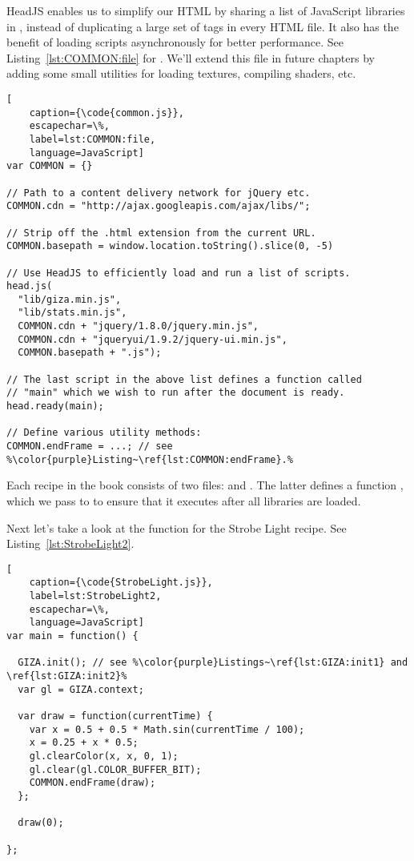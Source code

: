 HeadJS enables us to simplify our HTML by sharing a list of JavaScript libraries in , instead of duplicating a large set of  tags in every HTML file.  It also has the benefit of loading scripts asynchronously for better performance.  See Listing~\ref{lst:COMMON:file} for .  We'll extend this file in future chapters by adding some small utilities for loading textures, compiling shaders, etc.

\begin{lstlisting}[
    caption={\code{common.js}},
    escapechar=\%,
    label=lst:COMMON:file,
    language=JavaScript]
var COMMON = {}

// Path to a content delivery network for jQuery etc.
COMMON.cdn = "http://ajax.googleapis.com/ajax/libs/";

// Strip off the .html extension from the current URL.
COMMON.basepath = window.location.toString().slice(0, -5)

// Use HeadJS to efficiently load and run a list of scripts.
head.js(
  "lib/giza.min.js",
  "lib/stats.min.js",
  COMMON.cdn + "jquery/1.8.0/jquery.min.js",
  COMMON.cdn + "jqueryui/1.9.2/jquery-ui.min.js",
  COMMON.basepath + ".js");

// The last script in the above list defines a function called
// "main" which we wish to run after the document is ready.
head.ready(main);

// Define various utility methods:
COMMON.endFrame = ...; // see %\color{purple}Listing~\ref{lst:COMMON:endFrame}.%
\end{lstlisting} 

Each recipe in the book consists of two files:  and .  The latter defines a function , which we pass to  to ensure that it executes after all libraries are loaded.

\begin{comment}
{RecipeName}.js
{RecipeName}.html
common.js
css/style.css
lib/head.load.min.js
lib/giza.min.js
lib/stats.min.js
\end{comment}

Next let's take a look at the  function for the Strobe Light recipe.  See Listing~\ref{lst:StrobeLight2}.

\begin{lstlisting}[
    caption={\code{StrobeLight.js}},
    label=lst:StrobeLight2,
    escapechar=\%,
    language=JavaScript]
var main = function() {

  GIZA.init(); // see %\color{purple}Listings~\ref{lst:GIZA:init1} and \ref{lst:GIZA:init2}%
  var gl = GIZA.context;

  var draw = function(currentTime) {
    var x = 0.5 + 0.5 * Math.sin(currentTime / 100);
    x = 0.25 + x * 0.5;
    gl.clearColor(x, x, 0, 1);
    gl.clear(gl.COLOR_BUFFER_BIT);
    COMMON.endFrame(draw);
  };

  draw(0);

};
\end{lstlisting} 

